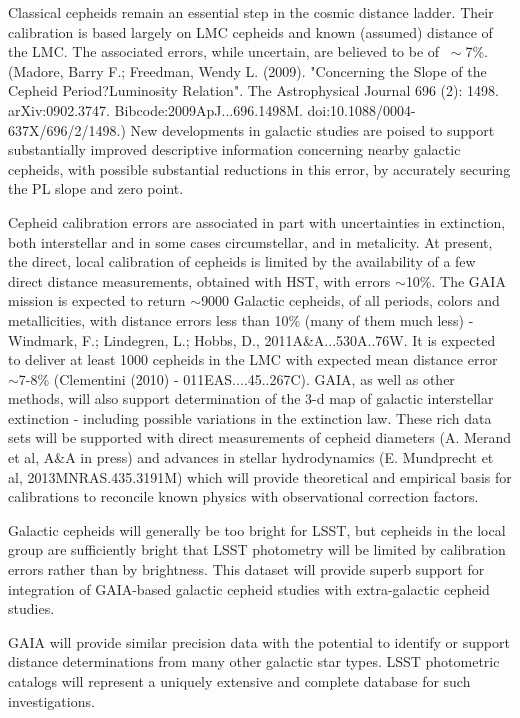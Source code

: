 Classical cepheids remain an essential step in the cosmic distance ladder. Their calibration is based largely on LMC cepheids and known (assumed) distance of the LMC.  The associated errors, while uncertain, are believed to be of $\>\sim$7\%. (Madore, Barry F.; Freedman, Wendy L. (2009). "Concerning the Slope of the Cepheid Period?Luminosity Relation". The Astrophysical Journal 696 (2): 1498. arXiv:0902.3747. Bibcode:2009ApJ...696.1498M. doi:10.1088/0004-637X/696/2/1498.) New developments in galactic studies are poised to support substantially improved descriptive information concerning nearby galactic cepheids, with possible substantial reductions in this error, by accurately securing the PL slope and zero point.

Cepheid calibration errors are associated in part with uncertainties in extinction, both interstellar and in some cases circumstellar, and in metalicity.  At present, the direct, local calibration of cepheids is limited by the availability of a few direct distance measurements, obtained with HST, with errors $\sim$10\%.  The GAIA mission is expected to return $\sim$9000 Galactic cepheids, of all periods, colors and metallicities, with distance errors less than 10\% (many of them much less) - Windmark, F.; Lindegren, L.; Hobbs, D., 2011A\&A...530A..76W. It is expected to deliver at least 1000 cepheids in the LMC with expected mean distance error $\sim$7-8\% (Clementini (2010) - 011EAS....45..267C).  GAIA, as well as other methods, will also support determination of the 3-d map of galactic interstellar extinction - including possible variations in the extinction law. These rich data sets will be supported with direct measurements of cepheid diameters (A. Merand et al, A\&A in press) and advances in stellar hydrodynamics (E. Mundprecht et al, 2013MNRAS.435.3191M) which will provide theoretical and empirical basis for calibrations to reconcile known physics with observational correction factors.

Galactic cepheids will generally be too bright for LSST, but cepheids in the local group are sufficiently bright that LSST photometry will be limited by calibration errors rather than by brightness.  This dataset will provide superb support for integration of GAIA-based galactic cepheid studies with extra-galactic cepheid studies.

GAIA will provide similar precision data with the potential to identify or support distance determinations from many other galactic star types.  LSST photometric catalogs will represent a uniquely extensive and complete database for such investigations.

